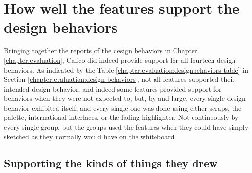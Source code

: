 
\section{How well the features support the design behaviors}
\label{discussion:designbehaviors}



Bringing together the reports of the design behaviors in Chapter \ref{chapter:evaluation}, Calico did indeed provide support for all fourteen design behaviors. As indicated by the Table \ref{chapter:evaluation:designbehaviors-table} in Section \ref{chapter:evaluation:design-behaviors}, not all features supported their intended design behavior, and indeed some features provided support for behaviors when they were not expected to, but, by and large, every single design behavior exhibited itself, and every single one was done using either scraps, the palette, international interfaces, or the fading highlighter. Not continuously by every single group, but the groups used the features when they could have simply sketched as they normally would have on the whiteboard. 

\subsection{Supporting the kinds of things they drew}

